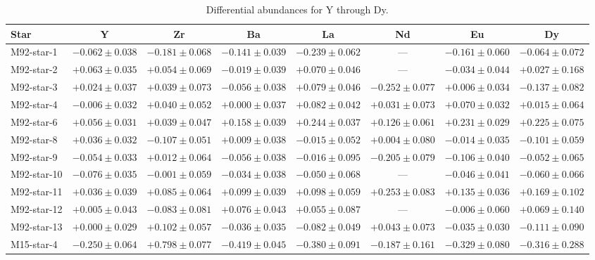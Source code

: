\begin{table}
\caption{Differential abundances for Y through Dy.}\label{tab:abund3}
\begin{tabular*}{\textheight}{@{\extracolsep\fill}l c c c c c c c@{}}
\toprule
Star & Y & Zr & Ba & La & Nd & Eu & Dy \\ \midrule
M92-star-1 & $-0.062 \pm 0.038$ & $-0.181 \pm 0.068$ & $-0.141 \pm 0.039$ & $-0.239 \pm 0.062$ & --- & $-0.161 \pm 0.060$ & $-0.064 \pm 0.072$ \\ 
M92-star-2 & $+0.063 \pm 0.035$ & $+0.054 \pm 0.069$ & $-0.019 \pm 0.039$ & $+0.070 \pm 0.046$ & --- & $-0.034 \pm 0.044$ & $+0.027 \pm 0.168$ \\ 
M92-star-3 & $+0.024 \pm 0.037$ & $+0.039 \pm 0.073$ & $-0.056 \pm 0.038$ & $+0.079 \pm 0.046$ & $-0.252 \pm 0.077$ & $+0.006 \pm 0.034$ & $-0.137 \pm 0.082$ \\ 
M92-star-4 & $-0.006 \pm 0.032$ & $+0.040 \pm 0.052$ & $+0.000 \pm 0.037$ & $+0.082 \pm 0.042$ & $+0.031 \pm 0.073$ & $+0.070 \pm 0.032$ & $+0.015 \pm 0.064$ \\ 
M92-star-6 & $+0.056 \pm 0.031$ & $+0.039 \pm 0.047$ & $+0.158 \pm 0.039$ & $+0.244 \pm 0.037$ & $+0.126 \pm 0.061$ & $+0.231 \pm 0.029$ & $+0.225 \pm 0.075$ \\ 
M92-star-8 & $+0.036 \pm 0.032$ & $-0.107 \pm 0.051$ & $+0.009 \pm 0.038$ & $-0.015 \pm 0.052$ & $+0.004 \pm 0.080$ & $-0.014 \pm 0.035$ & $-0.101 \pm 0.059$ \\ 
M92-star-9 & $-0.054 \pm 0.033$ & $+0.012 \pm 0.064$ & $-0.056 \pm 0.038$ & $-0.016 \pm 0.095$ & $-0.205 \pm 0.079$ & $-0.106 \pm 0.040$ & $-0.052 \pm 0.065$ \\ 
M92-star-10 & $-0.076 \pm 0.035$ & $-0.001 \pm 0.059$ & $-0.034 \pm 0.038$ & $-0.050 \pm 0.068$ & --- & $-0.046 \pm 0.041$ & $-0.060 \pm 0.066$ \\ 
M92-star-11 & $+0.036 \pm 0.039$ & $+0.085 \pm 0.064$ & $+0.099 \pm 0.039$ & $+0.098 \pm 0.059$ & $+0.253 \pm 0.083$ & $+0.135 \pm 0.036$ & $+0.169 \pm 0.102$ \\ 
M92-star-12 & $+0.005 \pm 0.043$ & $-0.083 \pm 0.081$ & $+0.076 \pm 0.043$ & $+0.055 \pm 0.087$ & --- & $-0.006 \pm 0.060$ & $+0.069 \pm 0.140$ \\ 
M92-star-13 & $+0.000 \pm 0.029$ & $+0.102 \pm 0.057$ & $-0.036 \pm 0.035$ & $-0.082 \pm 0.049$ & $+0.043 \pm 0.073$ & $-0.035 \pm 0.030$ & $-0.111 \pm 0.090$ \\ 
M15-star-4 & $-0.250 \pm 0.064$ & $+0.798 \pm 0.077$ & $-0.419 \pm 0.045$ & $-0.380 \pm 0.091$ & $-0.187 \pm 0.161$ & $-0.329 \pm 0.080$ & $-0.316 \pm 0.288$ \\ 

\end{tabular*}
\end{table}
